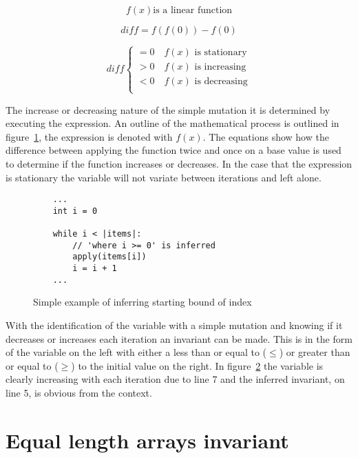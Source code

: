 \begin{figure}
    $$f(x) \text{is a linear function}$$

    $$diff = f(f(0)) - f(0)$$

    \[
        diff \begin{cases}
            = 0 \quad f(x) \text{ is stationary}\\
            > 0 \quad f(x) \text{ is increasing}\\
            < 0 \quad f(x) \text{ is decreasing}\\
        \end{cases}
    \]
\label{math:simple-mutation}
\end{figure}

The increase or decreasing nature of the simple mutation it is determined by
executing the expression. An outline of the mathematical process is outlined
in figure~\ref{math:simple-mutation}, the expression is denoted with $f(x)$.
The equations show how the difference between applying the function twice and once on a base value is used to
determine if the function increases or decreases.
In the case that the expression is stationary the variable will not variate
between iterations and left alone.

\begin{figure}[ht]
\begin{lstlisting}
    ...
    int i = 0

    while i < |items|:
        // 'where i >= 0' is inferred
        apply(items[i])
        i = i + 1
    ...
\end{lstlisting}
\caption{Simple example of inferring starting bound of index}
\label{lst:whiley-start}
\end{figure}

With the identification of the variable with a simple mutation and knowing
if it decreases or increases each iteration an invariant can be made.
This is in the form of the variable on the left with either a less than or
equal to ($\leq$) or greater than or equal to ($\geq$) to the initial value on the
right.
In figure~\ref{lst:whiley-start} the variable  is clearly increasing
with each iteration due to line 7 and the inferred invariant, on line 5, is
obvious from the context.

\section{Equal length arrays invariant}

